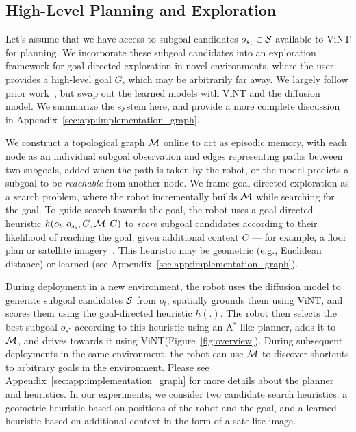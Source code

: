 \documentclass{article}
\newcommand{\ModelName}{ViNT\xspace}
\newcommand{\Astar}[0]{A$^*$\xspace}
\begin{document}
\subsection{High-Level Planning and Exploration}
\label{sec:method_graph}

Let's assume that we have access to subgoal candidates $o_{s_i} \in {\mathcal{S}}$
available to \ModelName for planning. We incorporate these subgoal candidates into an exploration framework for goal-directed exploration in novel environments, where the user provides a high-level goal $G$, which may be arbitrarily far away.
We largely follow prior work~\cite{shah2022viking}, but swap out the learned models with \ModelName and the diffusion model. We summarize the system here, and provide a more complete discussion in Appendix~\ref{sec:app:implementation_graph}.

We construct a topological graph ${\mathcal{M}}$ online to act as episodic memory, with each node as an individual subgoal observation and edges representing paths between two subgoals, added when the path is taken by the robot, or the model predicts a subgoal to be \emph{reachable} from another node.
We frame goal-directed exploration as a search problem, where the robot incrementally builds ${\mathcal{M}}$ while searching for the goal. To guide search towards the goal, the robot uses a goal-directed heuristic $h(o_t, o_{s_i}, G, {\mathcal{M}}, C)$ to \emph{score} subgoal candidates according to their likelihood of reaching the goal, given additional context $C$ --- for example, a floor plan or satellite imagery~\cite{shah2022viking, truong2023i2o}. This heuristic may be geometric (e.g., Euclidean distance) or learned (see Appendix~\ref{sec:app:implementation_graph}).

During deployment in a new environment, the robot uses the diffusion model to generate subgoal candidates ${\mathcal{S}}$ from $o_t$, spatially grounds them using \ModelName,
and scores them using the goal-directed heuristic $h(.)$. The robot then selects the best subgoal $o_{s^*}$ according to this heuristic using an \Astar-like planner, adds it to ${\mathcal{M}}$, and drives towards it using \ModelName (Figure~\ref{fig:overview}). During subsequent deployments in the same environment, the robot can use ${\mathcal{M}}$ to discover shortcuts to arbitrary goals in the environment.
Please see Appendix~\ref{sec:app:implementation_graph} for more details about the planner and heuristics. In our experiments, we consider two candidate search heuristics: a geometric heuristic based on positions of the robot and the goal, and a learned heuristic based on additional context in the form of a satellite image.
\end{document}
